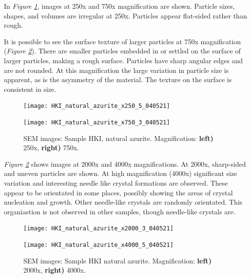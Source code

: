 In \textit{Figure \ref{fig:hki_nat_az_sem_1}}, images at 250x and 750x magnification are shown. Particle sizes, shapes, and volumes are irregular at 250x. Particles appear flat-sided rather than rough. 

It is possible to see the surface texture of larger particles at 750x magnification (\textit{Figure \ref{fig:hki_nat_az_sem_2}}). There are smaller particles embedded in or settled on the surface of larger particles, making a rough surface. Particles have sharp angular edges and are not rounded. At this magnification the large variation in particle size is apparent, as is the asymmetry of the material. The texture on the surface is consistent in size.

\begin{figure}[H]
\centering
\begin{minipage}{.45\textwidth}
  \centering
  \texttt{[image: HKI\_natural\_azurite\_x250\_5\_040521]}
\end{minipage}
\begin{minipage}{.45\textwidth}
  \centering
  \texttt{[image: HKI\_natural\_azurite\_x750\_3\_040521]}
\end{minipage}
\caption[SEM images: Sample HKI, natural azurite]{SEM images: Sample HKI, natural azurite. Magnification: \textbf{left)} 250x, \textbf{right)} 750x.}
\label{fig:hki_nat_az_sem_1}
\end{figure}

\textit{Figure \ref{fig:hki_nat_az_sem_2}} shows images at 2000x and 4000x magnifications. At 2000x, sharp-sided and uneven particles are shown. At high magnification (4000x) significant size variation and interesting needle like crystal formations are observed. These appear to be orientated in some places, possibly showing the areas of crystal nucleation and growth. Other needle-like crystals are randomly orientated. This organiastion is not  observed in other samples, though needle-like crystals are.

\begin{figure}[H]
\centering
\begin{minipage}{.45\textwidth}
  \centering
  \texttt{[image: HKI\_natural\_azurite\_x2000\_3\_040521]}
\end{minipage}
\begin{minipage}{.45\textwidth}
  \centering
  \texttt{[image: HKI\_natural\_azurite\_x4000\_5\_040521]}
\end{minipage}
\caption[SEM images: Sample HKI natural azurite]{SEM images: Sample HKI natural azurite. Magnification: \textbf{left)} 2000x, \textbf{right)} 4000x.}
\label{fig:hki_nat_az_sem_2}
\end{figure}



